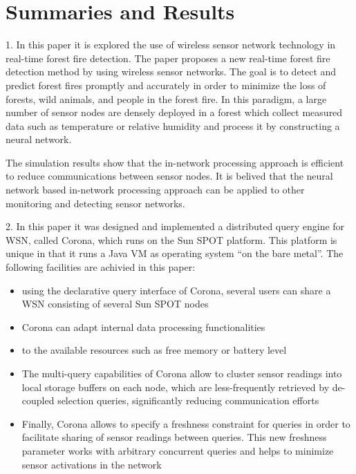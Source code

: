\section{Summaries and Results}

1. In this paper it is explored the use of wireless sensor network technology in real-time forest fire detection. The paper proposes a new real-time forest fire detection method by using wireless sensor networks. The goal is to detect and predict forest fires promptly and accurately in order to minimize the loss of forests, wild animals, and people in the forest fire. In this paradigm, a large number of sensor nodes are densely deployed in a forest which collect measured data such as temperature or relative humidity and process it by constructing a neural network.
\smallskip

The simulation results show that the in-network processing approach is efficient to reduce communications between sensor nodes. It is belived that the neural network based in-network processing approach can be applied to other monitoring and detecting sensor networks.
\smallskip

2. In this paper it was designed and implemented a distributed query engine for WSN, called Corona, which runs on the Sun SPOT platform. This platform is unique in that it runs a Java VM as operating system “on the bare metal”. The following facilities are achivied in this paper:

\begin{itemize}
    \item using the declarative query interface of Corona, several users can share a WSN consisting of several Sun SPOT nodes
    \item Corona can adapt internal data processing functionalities
    \item to the available resources such as free memory or battery level
    \item The multi-query capabilities of Corona allow to cluster sensor readings into local storage buffers on each node, which are less-frequently retrieved by de-coupled selection queries, significantly reducing communication efforts
    \item Finally, Corona allows to specify a freshness constraint for queries in order to facilitate sharing of sensor readings between queries. This new freshness parameter works with arbitrary concurrent queries and helps to minimize sensor activations in the network
\end{itemize}
\smallskip

